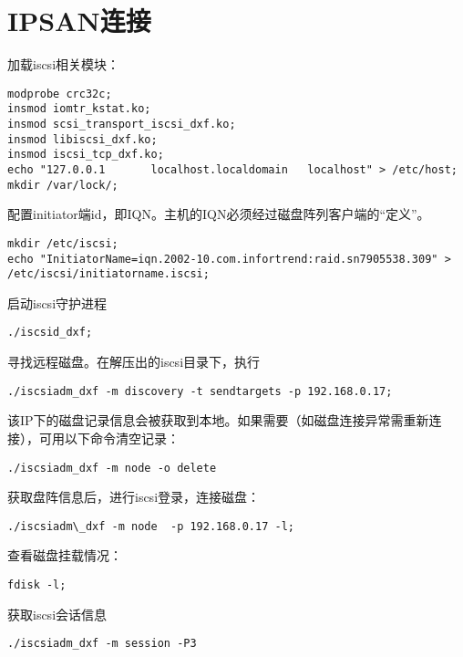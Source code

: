 \section{IPSAN连接}
加载iscsi相关模块：
\begin{verbatim}
modprobe crc32c;
insmod iomtr_kstat.ko;
insmod scsi_transport_iscsi_dxf.ko;
insmod libiscsi_dxf.ko;
insmod iscsi_tcp_dxf.ko;
echo "127.0.0.1       localhost.localdomain   localhost" > /etc/host;
mkdir /var/lock/;
\end{verbatim}

配置initiator端id，即IQN。主机的IQN必须经过磁盘阵列客户端的“定义”。
\begin{verbatim}
mkdir /etc/iscsi;
echo "InitiatorName=iqn.2002-10.com.infortrend:raid.sn7905538.309" > /etc/iscsi/initiatorname.iscsi;
\end{verbatim}

启动iscsi守护进程
\begin{verbatim}
./iscsid_dxf;
\end{verbatim}

寻找远程磁盘。在解压出的iscsi目录下，执行
\begin{verbatim}
./iscsiadm_dxf -m discovery -t sendtargets -p 192.168.0.17;
\end{verbatim}

该IP下的磁盘记录信息会被获取到本地。如果需要（如磁盘连接异常需重新连接），可用以下命令清空记录：
\begin{verbatim}
./iscsiadm_dxf -m node -o delete
\end{verbatim}

获取盘阵信息后，进行iscsi登录，连接磁盘：
\begin{verbatim}
./iscsiadm\_dxf -m node  -p 192.168.0.17 -l;
\end{verbatim}

查看磁盘挂载情况：
\begin{verbatim}
fdisk -l;
\end{verbatim}

获取iscsi会话信息
\begin{verbatim}
./iscsiadm_dxf -m session -P3
\end{verbatim}





